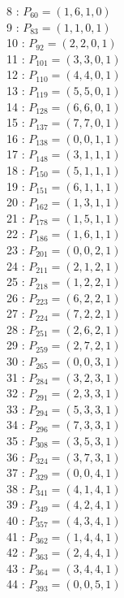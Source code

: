 \documentclass{article}
\begin{document}
{\begin{multicols}{3}
8 : $P_{60}=( 1, 6, 1, 0 )$\\
9 : $P_{83}=( 1, 1, 0, 1 )$\\
10 : $P_{92}=( 2, 2, 0, 1 )$\\
11 : $P_{101}=( 3, 3, 0, 1 )$\\
12 : $P_{110}=( 4, 4, 0, 1 )$\\
13 : $P_{119}=( 5, 5, 0, 1 )$\\
14 : $P_{128}=( 6, 6, 0, 1 )$\\
15 : $P_{137}=( 7, 7, 0, 1 )$\\
16 : $P_{138}=( 0, 0, 1, 1 )$\\
17 : $P_{148}=( 3, 1, 1, 1 )$\\
18 : $P_{150}=( 5, 1, 1, 1 )$\\
19 : $P_{151}=( 6, 1, 1, 1 )$\\
20 : $P_{162}=( 1, 3, 1, 1 )$\\
21 : $P_{178}=( 1, 5, 1, 1 )$\\
22 : $P_{186}=( 1, 6, 1, 1 )$\\
23 : $P_{201}=( 0, 0, 2, 1 )$\\
24 : $P_{211}=( 2, 1, 2, 1 )$\\
25 : $P_{218}=( 1, 2, 2, 1 )$\\
26 : $P_{223}=( 6, 2, 2, 1 )$\\
27 : $P_{224}=( 7, 2, 2, 1 )$\\
28 : $P_{251}=( 2, 6, 2, 1 )$\\
29 : $P_{259}=( 2, 7, 2, 1 )$\\
30 : $P_{265}=( 0, 0, 3, 1 )$\\
31 : $P_{284}=( 3, 2, 3, 1 )$\\
32 : $P_{291}=( 2, 3, 3, 1 )$\\
33 : $P_{294}=( 5, 3, 3, 1 )$\\
34 : $P_{296}=( 7, 3, 3, 1 )$\\
35 : $P_{308}=( 3, 5, 3, 1 )$\\
36 : $P_{324}=( 3, 7, 3, 1 )$\\
37 : $P_{329}=( 0, 0, 4, 1 )$\\
38 : $P_{341}=( 4, 1, 4, 1 )$\\
39 : $P_{349}=( 4, 2, 4, 1 )$\\
40 : $P_{357}=( 4, 3, 4, 1 )$\\
41 : $P_{362}=( 1, 4, 4, 1 )$\\
42 : $P_{363}=( 2, 4, 4, 1 )$\\
43 : $P_{364}=( 3, 4, 4, 1 )$\\
44 : $P_{393}=( 0, 0, 5, 1 )$\\

\end{multicols}}
\end{document}
